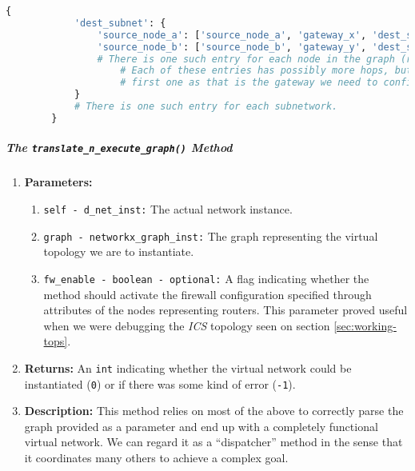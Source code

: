     \begin{lstlisting}[language = python, caption = Data structure containing all the network's routes., label = last:route-dict]
        {
            'dest_subnet': {
                'source_node_a': ['source_node_a', 'gateway_x', 'dest_subnet_bridge'],
                'source_node_b': ['source_node_b', 'gateway_y', 'dest_subnet_bridge'],
                # There is one such entry for each node in the graph (routers, bridges and hosts).
                    # Each of these entries has possibly more hops, but we are only interested in the
                    # first one as that is the gateway we need to configure.
            }
            # There is one such entry for each subnetwork.
        }
    \end{lstlisting}

    \subparagraph{The \texttt{translate\_n\_execute\_graph()} Method}
        \begin{enumerate}
            \item \textbf{Parameters:}
            \begin{enumerate}
                \item \texttt{self - d\_net\_inst:} The actual network instance.
                \item \texttt{graph - networkx\_graph\_inst:} The graph representing the virtual topology we are to instantiate.
                \item \texttt{fw\_enable - boolean - optional:} A flag indicating whether the method should activate the firewall configuration specified through attributes of the nodes representing routers. This parameter proved useful when we were debugging the \textit{ICS} topology seen on section \ref{sec:working-tops}.
            \end{enumerate}
            \item \textbf{Returns:} An \texttt{int} indicating whether the virtual network could be instantiated (\texttt{0}) or if there was some kind of error (\texttt{-1}).
            \item \textbf{Description:} This method relies on most of the above to correctly parse the graph provided as a parameter and end up with a completely functional virtual network. We can regard it as a ``dispatcher'' method in the sense that it coordinates many others to achieve a complex goal.
        \end{enumerate}

